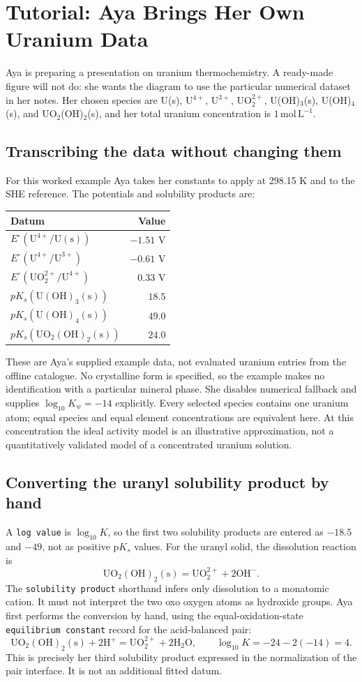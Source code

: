 \documentclass[a4paper,11pt]{ltxdoc}
\begin{document}
\section{Tutorial: Aya Brings Her Own Uranium Data}
\label{sec:tutorial-uranium}
Aya is preparing a presentation on uranium thermochemistry. A ready-made figure
will not do: she wants the diagram to use the particular numerical dataset in
her notes. Her chosen species are U(s), U$^{4+}$, U$^{3+}$, UO$_2^{2+}$,
U(OH)$_3$(s), U(OH)$_4$(s), and UO$_2$(OH)$_2$(s), and her total uranium
concentration is $1\,\mathrm{mol\,L^{-1}}$.

\subsection{Transcribing the data without changing them}
For this worked example Aya takes her constants to apply at 298.15 K and to the
SHE reference. The potentials and solubility products are:
\begin{center}
\begin{tabular}{lr}
Datum & Value\\\hline
$E^\circ(\mathrm{U^{4+}/U(s)})$ & $-1.51$ V\\
$E^\circ(\mathrm{U^{4+}/U^{3+}})$ & $-0.61$ V\\
$E^\circ(\mathrm{UO_2^{2+}/U^{4+}})$ & $0.33$ V\\
$pK_s(\mathrm{U(OH)_3(s)})$ & $18.5$\\
$pK_s(\mathrm{U(OH)_4(s)})$ & $49.0$\\
$pK_s(\mathrm{UO_2(OH)_2(s)})$ & $24.0$
\end{tabular}
\end{center}
These are Aya's supplied example data, not evaluated uranium entries from the
offline catalogue. No crystalline form is specified, so the example makes no
identification with a particular mineral phase. She disables numerical fallback
and supplies $\log_{10}K_w=-14$ explicitly. Every selected species contains one
uranium atom; equal species and equal element concentrations are equivalent here.
At this concentration the ideal activity model is an illustrative approximation,
not a quantitatively validated model of a concentrated uranium solution.

\subsection{Converting the uranyl solubility product by hand}
A \texttt{log value} is $\log_{10}K$, so the first two solubility products are
entered as $-18.5$ and $-49$, not as positive p$K_s$ values.
For the uranyl solid, the dissolution reaction is
\[
 \mathrm{UO_2(OH)_2(s)}=
 \mathrm{UO_2^{2+}}+2\mathrm{OH^-}.
\]
The \texttt{solubility product} shorthand infers only dissolution to a monatomic
cation. It must not interpret the two oxo oxygen atoms as hydroxide groups.
Aya first performs the conversion by hand, using the equal-oxidation-state \texttt{equilibrium constant}
record for the acid-balanced pair:
\[
 \mathrm{UO_2(OH)_2(s)}+2\mathrm{H^+}=
 \mathrm{UO_2^{2+}}+2\mathrm{H_2O},\qquad
 \log_{10}K=-24-2(-14)=4.
\]
This is precisely her third solubility product expressed in the normalization
of the pair interface. It is not an additional fitted datum.
\end{document}
